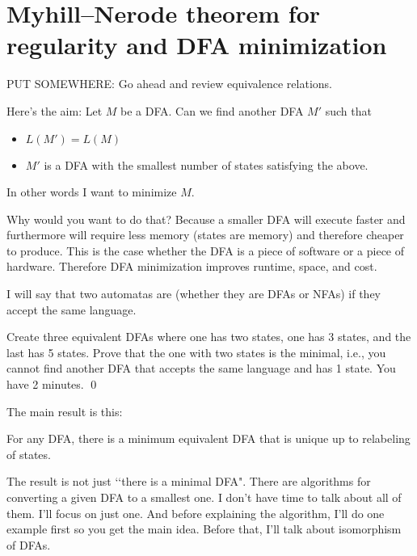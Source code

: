 
\section{Myhill--Nerode theorem for regularity and DFA minimization}

PUT SOMEWHERE: Go ahead and review equivalence relations.

Here's the aim: Let $M$ be a DFA. Can we find another DFA $M'$ such
that
\begin{itemize}
\item $L(M') = L(M)$
\item $M'$ is a DFA with the smallest number of states satisfying
  the above.
\end{itemize}
In other words I want to minimize $M$.

Why would you want to do that?
Because a smaller DFA will execute faster and
furthermore will require less memory (states are memory)
and therefore cheaper to produce.
This is the case whether the DFA is a piece of software
or a piece of hardware.
Therefore DFA minimization improves runtime, space,
and cost.

I will say that two automatas are  (whether they
are DFAs or NFAs) if they
accept the same language.

\begin{ex}
  Create three equivalent DFAs
  where
  one has two states, one has 3 states, and the last has 5 states.
  Prove that the one with two states is the minimal, i.e.,
  you cannot find another DFA that accepts the same language
  and has 1 state.
  You have 2 minutes.
  \qed
\end{ex}

The main result is this:

\begin{thm}
  For any DFA, there is a minimum equivalent DFA that is unique
  up to relabeling of states.
\end{thm}

The result is not just \lq\lq there is a minimal DFA".
There are algorithms for converting a given DFA to a smallest one.
I don't have time to talk about all of them.
I'll focus on just one.
And before explaining the algorithm, I'll do one example
first so you get the main idea.
Before that, I'll talk about isomorphism of DFAs.

